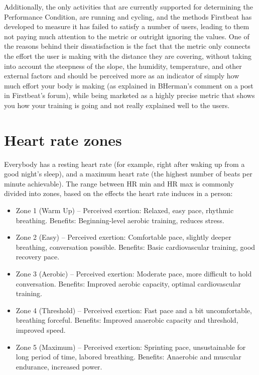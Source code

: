 Additionally, the only activities that are currently supported for determining the Performance Condition, are running and cycling,
and the methods Firstbeat has developed to measure it has failed to satisfy a number of users, leading to them not paying much attention to the metric or outright ignoring the values.\cite{performance-condition-unreliable1}\cite{performance-condition-unreliable-reasoning}
One of the reasons behind their dissatisfaction is the fact that the metric only connects the effort the user is making with the distance they are covering,
 without taking into account the steepness of the slope, the humidity, temperature, and other external factors 
 and should be perceived more as an indicator of simply how much effort your body is making (as explained in BHerman's comment on a post\cite{performance-condition-unreliable-reasoning} in Firstbeat's forum), 
while being marketed as a highly precise metric that shows you how your training is going and not really explained well to the users.

\section{Heart rate zones}

Everybody has a resting heart rate (for example, right after waking up from a good night's sleep), and a maximum heart rate (the highest number of beats per minute achievable).
The range between HR min and HR max is commonly divided into zones, based on the effects the heart rate induces in a person:
\begin{itemize}
    \item Zone 1 (Warm Up) --
    Perceived exertion: Relaxed, easy pace, rhythmic breathing.
    Benefits: Beginning-level aerobic training, reduces stress.
    \item Zone 2 (Easy) --
    Perceived exertion: Comfortable pace, slightly deeper breathing, conversation possible.
    Benefits: Basic cardiovascular training, good recovery pace.
    \item Zone 3 (Aerobic) --
    Perceived exertion: Moderate pace, more difficult to hold conversation.
    Benefits: Improved aerobic capacity, optimal cardiovascular training.
    \item Zone 4 (Threshold) --
    Perceived exertion: Fast pace and a bit uncomfortable, breathing forceful.
    Benefits: Improved anaerobic capacity and threshold, improved speed.
    \item Zone 5 (Maximum) --
    Perceived exertion: Sprinting pace, unsustainable for long period of time, labored breathing.
    Benefits: Anaerobic and muscular endurance, increased power.\cite{garmin-heart-zones}
\end{itemize}


